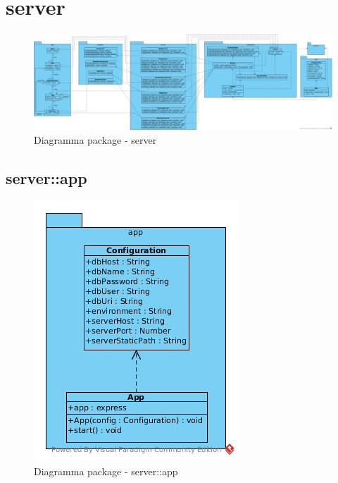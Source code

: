 \section{server}
\begin{center}
		\begin{figure}[H]
			\centering \includegraphics[scale=4, max width=\textwidth, max height=\myheight]{../img/diagrammiClassi/server.png}
			\caption{Diagramma package - server}
		\end{figure}
	\end{center}\subsection{server::app}
\begin{center}
		\begin{figure}[H]
			\centering \includegraphics[scale=4, max width=\textwidth, max height=\myheight]{../img/diagrammiClassi/server/app.png}
			\caption{Diagramma package - server::app}
		\end{figure}
	\end{center}\hypertarget{server::app::App}{}

